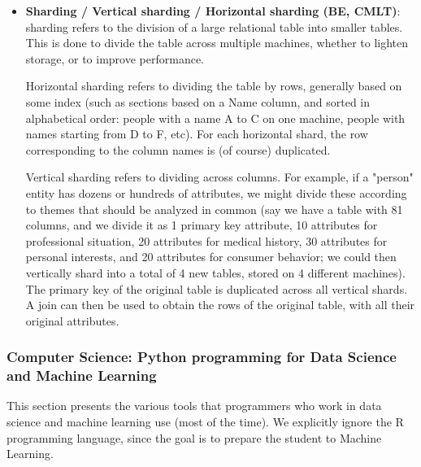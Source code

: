 \documentclass{article}
\begin{document}
\begin{itemize}
	\item \textbf{Sharding / Vertical sharding / Horizontal sharding (BE, CMLT)}: sharding refers to the division of a large relational table into smaller tables. This is done to divide the table across multiple machines, whether to lighten storage, or to improve performance.

	Horizontal sharding refers to dividing the table by rows, generally based on some index (such as sections based on a Name column, and sorted in alphabetical order: people with a name A to C on one machine, people with names starting from D to F, etc). For each horizontal shard, the row corresponding to the column names is (of course) duplicated.

	Vertical sharding refers to dividing across columns. For example, if a "person" entity has dozens or hundreds of attributes, we might divide these according to themes that should be analyzed in common (say we have a table with 81 columns, and we divide it as 1 primary key attribute, 10 attributes for professional situation, 20 attributes for medical history, 30 attributes for personal interests, and 20 attributes for consumer behavior; we could then vertically shard into a total of 4 new tables, stored on 4 different machines). The primary key of the original table is duplicated across all vertical shards. A join can then be used to obtain the rows of the original table, with all their original attributes.

\end{itemize}



\subsubsection*{Computer Science: Python programming for Data Science and Machine Learning}

This section presents the various tools that programmers who work in data science and machine learning use (most of the time). We explicitly ignore the R programming language, since the goal is to prepare the student to Machine Learning.
\end{document}
